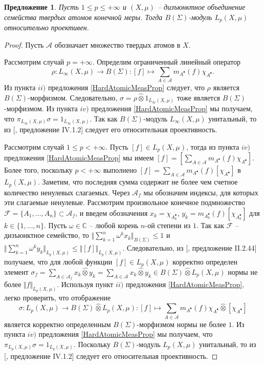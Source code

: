 \documentclass[12pt]{article}
\newtheorem{proposition}[theorem]{Предложение}
\newcommand{\projtens}{\mathbin{\widehat{\otimes}}}
\begin{document}
\begin{proposition}\label{LpBSigmaModSuffCond} Пусть $1\leq p\leq +\infty$ и $(X,\mu)$ -- дизъюнктное объединение семейства твердых атомов конечной меры. Тогда $B(\Sigma)$-модуль $L_p(X,\mu)$ относительно проективен.
\end{proposition}
\begin{proof} Пусть $\mathcal{A}$ обозначает множество твердых атомов в $X$.

    Рассмотрим случай $p=+\infty$. Определим ограниченный линейный оператор
    $$
        \rho:L_\infty(X,\mu)\to B(\Sigma):[f]\mapsto\sum_{A\in\mathcal{A}}m_{A^\bullet}(f)\chi_{A^\bullet}.
    $$
    Из пункта $ii)$ предложения \ref{HardAtomicMeasProp} следует, что $\rho$ является $B(\Sigma)$-морфизмом. Следовательно, $\sigma=\rho\projtens 1_{L_\infty(X,\mu)}$ тоже является $B(\Sigma)$-морфизмом. Из пункта $iv)$ предложения \ref{HardAtomicMeasProp} мы получаем, что $\pi_{L_\infty(X,\mu)}\sigma=1_{L_\infty(X,\mu)}$. Так как $B(\Sigma)$-модуль $L_\infty(X,\mu)$ унитальный, то из [\cite{HelHomolBanTopAlg}, предложение IV.1.2] следует его относительная проективность.

    Рассмотрим случай $1\leq p<+\infty$. Пусть $[f]\in L_p(X,\mu)$, тогда из пункта $iv)$ предложения \ref{HardAtomicMeasProp} мы имеем $[f]=[\sum_{A\in\mathcal{A}}m_{A^\bullet}(f)\chi_{A^\bullet}]$. Более того, поскольку $p<+\infty$ выполнено $[f]=\sum_{A\in\mathcal{A}}m_{A^\bullet}(f)[\chi_{A^\bullet}]$ в $L_p(X,\mu)$. Заметим, что последняя сумма содержит не более чем счетное количество ненулевых слагаемых. Через $\mathcal{A}_f$ мы обозначим индексы, для которых эти слагаемые ненулевые. Рассмотрим произвольное конечное подмножество $\mathcal{F}=\{A_1,\ldots,A_n\}\subset\mathcal{A}_f$, и введем обозначения $x_k=\chi_{A_k^\bullet}$, $y_k=m_{A_k^\bullet}(f)[\chi_{A_k^\bullet}]$ для $k\in\{1,\ldots,n\}$. Пусть $\omega\in\mathbb{C}$ -- любой корень $n$-ой степени из $1$. Так как $\mathcal{F}$ -- дизъюнктное семейство, то $\Vert\sum_{k=1}^n \omega^k x_k\Vert_{B(\Sigma)}\leq 1$ и $\Vert \sum_{k=1}^n\omega^k y_k\Vert_{L_p(X,\mu)}\leq\Vert [f]\Vert_{L_p(X,\mu)}$. Следовательно, из [\cite{HelHomolBanTopAlg}, предложение II.2.44] получаем, что для любой функции $[f]\in L_p(X,\mu)$ корректно определен элемент $\sigma_f=\sum_{A\in\mathcal{A}_f} x_k\projtens y_k=\sum_{A\in\mathcal{A}} x_k\projtens y_k\in B(\Sigma)\projtens L_p(X,\mu)$ нормы не более $\Vert f\Vert_{L_p(X,\mu)}$. Используя пункт $ii)$ предложения \ref{HardAtomicMeasProp}, легко проверить, что отображение
    $$
        \sigma: L_p(X,\mu)\to B(\Sigma)\projtens L_p(X,\mu):[f]\mapsto \sum_{A\in\mathcal{A}}m_{A^\bullet}(f)\chi_{A^\bullet}\projtens[\chi_{A^\bullet}]
    $$
    является корректно определенным $B(\Sigma)$-морфизмом нормы не более $1$. Из пункта $iv)$ предложения \ref{HardAtomicMeasProp} мы получаем, что $\pi_{L_p(X,\mu)}\sigma=1_{L_p(X,\mu)}$. Поскольку $B(\Sigma)$-модуль $L_p(X,\mu)$ унитальный, то из [\cite{HelHomolBanTopAlg}, предложение IV.1.2] следует его относительная проективность.
\end{proof}
\end{document}
